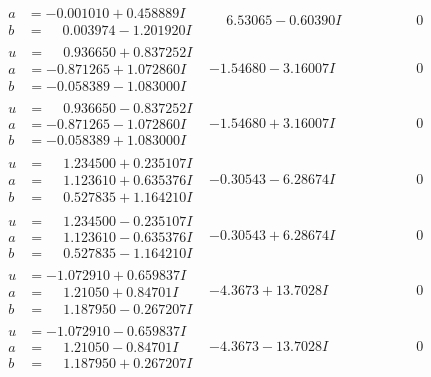 \documentclass[1p]{elsarticle_modified}
\theoremstyle{definition}
\begin{document}
$$\begin{array}{c|c|c}
\begin{aligned}
a &= -0.001010 + 0.458889 I \\
b &= \phantom{-}0.003974 - 1.201920 I\end{aligned}
 & \phantom{-}6.53065 - 0.60390 I & \phantom{-0.000000 } 0 \\ \hline\begin{aligned}
u &= \phantom{-}0.936650 + 0.837252 I \\
a &= -0.871265 + 1.072860 I \\
b &= -0.058389 - 1.083000 I\end{aligned}
 & -1.54680 - 3.16007 I & \phantom{-0.000000 } 0 \\ \hline\begin{aligned}
u &= \phantom{-}0.936650 - 0.837252 I \\
a &= -0.871265 - 1.072860 I \\
b &= -0.058389 + 1.083000 I\end{aligned}
 & -1.54680 + 3.16007 I & \phantom{-0.000000 } 0 \\ \hline\begin{aligned}
u &= \phantom{-}1.234500 + 0.235107 I \\
a &= \phantom{-}1.123610 + 0.635376 I \\
b &= \phantom{-}0.527835 + 1.164210 I\end{aligned}
 & -0.30543 - 6.28674 I & \phantom{-0.000000 } 0 \\ \hline\begin{aligned}
u &= \phantom{-}1.234500 - 0.235107 I \\
a &= \phantom{-}1.123610 - 0.635376 I \\
b &= \phantom{-}0.527835 - 1.164210 I\end{aligned}
 & -0.30543 + 6.28674 I & \phantom{-0.000000 } 0 \\ \hline\begin{aligned}
u &= -1.072910 + 0.659837 I \\
a &= \phantom{-}1.21050 + 0.84701 I \\
b &= \phantom{-}1.187950 - 0.267207 I\end{aligned}
 & -4.3673 + 13.7028 I & \phantom{-0.000000 } 0 \\ \hline\begin{aligned}
u &= -1.072910 - 0.659837 I \\
a &= \phantom{-}1.21050 - 0.84701 I \\
b &= \phantom{-}1.187950 + 0.267207 I\end{aligned}
 & -4.3673 - 13.7028 I & \phantom{-0.000000 } 0 \\ \hline\begin{aligned}

\end{aligned}
\end{array}$$
\end{document}
